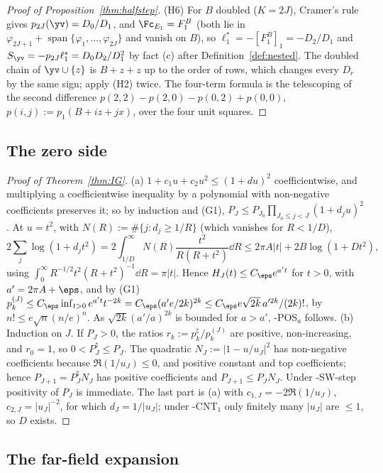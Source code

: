 \begin{proof}[Proof of Proposition~\textup{\ref{thm:halfstep}}]
(H6) For $B$ doubled ($K=2J$), Cramer's rule gives $p_{2J}(\yv)=D_0/D_1$, and $\Fc_{E_1}=F_1^B$ (both lie in
$\varphi_{2J+1}+\operatorname{span}\{\varphi_1,\dots,\varphi_{2J}\}$ and vanish on $B$), so $\ell_1^*=-[F_1^B]_1=-D_2/D_1$ and
$S_{\yv}=-p_{2J}\ell_1^*=D_0D_2/D_1^2$ by fact (c) after Definition~\ref{def:nested}. The doubled chain of
$\yv\cup\{z\}$ is $B+z+z$ up to the order of rows, which changes every $D_r$ by the same sign; apply (H2) twice.
The four-term formula is the telescoping of the second difference
$p(2,2)-p(2,0)-p(0,2)+p(0,0)$, $p(i,j):=p_1(B+iz+jx)$, over the four unit squares.
\end{proof}

\subsection{The zero side}\label{app:proofs-zeroside}
\begin{proof}[Proof of Theorem~\textup{\ref{thm:IG}}]
(a) $1+c_1u+c_2u^2\le(1+du)^2$ coefficientwise, and multiplying a coefficientwise inequality by a polynomial with
non-negative coefficients preserves it; so by induction and (G1), $P_J\le P_{J_0}\prod_{J_0\le j<J}(1+d_ju)^2$. At $u=t^2$,
with $N(R):=\#\{j:d_j\ge1/R\}$ (which vanishes for $R<1/D$),
\[
2\sum_j\log(1+d_jt^2)=2\int_{1/D}^\infty N(R)\frac{t^2}{R(R+t^2)}\dd R\le2\pi A\lvert t\rvert+2B\log(1+Dt^2),
\]
using $\int_0^\infty R^{-1/2}t^2(R+t^2)^{-1}\dd R=\pi\lvert t\rvert$. Hence $H_J(t)\le C_\eps e^{a't}$ for $t>0$, with
$a'=2\pi A+\eps$, and by (G1) $p_k^{(J)}\le C_\eps\inf_{t>0}e^{a't}t^{-2k}=C_\eps(a'e/2k)^{2k}\le C_\eps e\sqrt{2k}\,a'^{2k}/(2k)!$,
by $n!\le e\sqrt n(n/e)^n$. As $\sqrt{2k}(a'/a)^{2k}$ is bounded for $a>a'$, \hyp{POS$_a$} follows.
(b) Induction on $J$. If $P_J>0$, the ratios $r_k:=p^\natural_k/p^{(J)}_k$ are positive, non-increasing, and $r_0=1$, so
$0<P^\natural_J\le P_J$. The quadratic $N_J:=\lvert1-u/u_J\rvert^2$ has non-negative coefficients because
$\Re(1/u_J)\le0$, and positive constant and top coefficients; hence $P_{J+1}=P^\natural_JN_J$ has positive coefficients and
$P_{J+1}\le P_JN_J$. Under \hyp{SW-step} positivity of $P_J$ is immediate. The last part is (a) with
$c_{1,J}=-2\Re(1/u_J)$, $c_{2,J}=\lvert u_J\rvert^{-2}$, for which $d_J=1/\lvert u_J\rvert$; under \hyp{CNT$_1$} only finitely many
$\lvert u_J\rvert$ are $\le1$, so $D$ exists.
\end{proof}

\subsection{The far-field expansion}\label{app:proofs-Ftrue}

